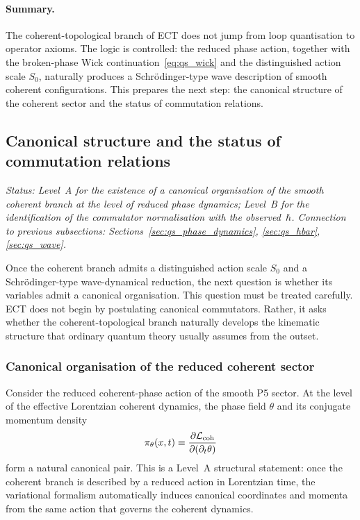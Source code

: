\paragraph{Summary.}
The coherent-topological branch of ECT does not jump from loop
quantisation to operator axioms.
The logic is controlled: the reduced phase action, together with the
broken-phase Wick continuation~\eqref{eq:qs_wick} and the distinguished
action scale $S_0$, naturally produces a Schr\"odinger-type wave
description of smooth coherent configurations.
This prepares the next step: the canonical structure of the coherent
sector and the status of commutation relations.

\subsection{Canonical structure and the status of commutation relations}
\label{sec:qs_ccr}

\textit{Status: Level~A for the existence of a canonical organisation
of the smooth coherent branch at the level of reduced phase dynamics;
Level~B for the identification of the commutator normalisation with
the observed~$\hbar$.
Connection to previous subsections:
Sections~\ref{sec:qs_phase_dynamics}, \ref{sec:qs_hbar},
\ref{sec:qs_wave}.}

\medskip
Once the coherent branch admits a distinguished action scale $S_0$ and
a Schr\"odinger-type wave-dynamical reduction, the next question is
whether its variables admit a canonical organisation.
This question must be treated carefully.
ECT does not begin by postulating canonical commutators.
Rather, it asks whether the coherent-topological branch naturally
develops the kinematic structure that ordinary quantum theory usually
assumes from the outset.

\subsubsection*{Canonical organisation of the reduced coherent sector}

Consider the reduced coherent-phase action of the smooth P5 sector.
At the level of the effective Lorentzian coherent dynamics, the phase
field $\theta$ and its conjugate momentum density
\begin{equation}
  \label{eq:qs_pi_theta}
  \pi_\theta(x,t)
  \equiv
  \frac{\partial \mathcal{L}_{\rm coh}}{\partial(\partial_t\theta)}
\end{equation}
form a natural canonical pair.
This is a Level~A structural statement: once the coherent branch is
described by a reduced action in Lorentzian time, the variational
formalism automatically induces canonical coordinates and momenta from
the same action that governs the coherent dynamics.


